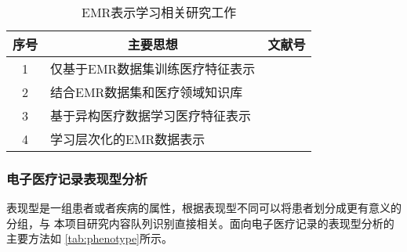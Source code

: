 \begin{table}
    \renewcommand\arraystretch{1.5}
    \begin{small}
        \caption{EMR表示学习相关研究工作}
        \label{tab:representation}
        \begin{center}
            \begin{tabular}[c]{cll}
                \toprule
                \multicolumn{1}{c}{\textbf{序号}} & 
                \multicolumn{1}{c}{\textbf{主要思想}} &
                \multicolumn{1}{c}{\textbf{文献号}}\\
                \midrule
                1 & 仅基于EMR数据集训练医疗特征表示 & \cite{tran2015learning}
                \cite{miotto2016deep} \cite{choi2016medical}
                 \cite{cai2018medical} \cite{peng2019temporal}
                 \cite{bai2019medical}\\
                2 & 结合EMR数据集和医疗领域知识库 & \cite{choi2017gram}
                \cite{choi2018mime} \cite{ma2018kame} \cite{song2019medical}\\
                3 & 基于异构医疗数据学习医疗特征表示 & \cite{choi2016learning}
                \cite{bai2017joint} \cite{ma2018drug}\\
                4 & 学习层次化的EMR数据表示 & \cite{choi2016multi}
                \cite{choi2020learning}\\
                \bottomrule
            \end{tabular}
        \end{center}
    \end{small}
\end{table}

{}

\subsubsection{电子医疗记录表现型分析}

表现型是一组患者或者疾病的属性，根据表现型不同可以将患者划分成更有意义的分组，与
本项目研究内容队列识别直接相关。面向电子医疗记录的表现型分析的主要方法如
\cref{tab:phenotype}所示。

